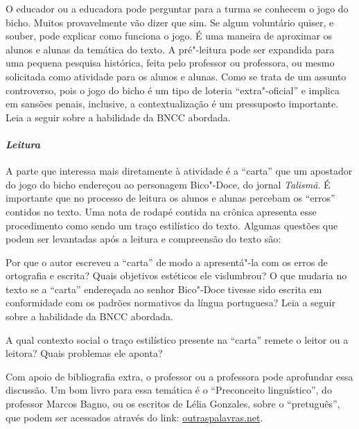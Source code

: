 \documentclass[11pt]{extarticle}
\begin{document}
O educador ou a educadora pode perguntar para a turma se conhecem o
jogo do bicho. Muitos provavelmente vão dizer que sim. Se algum
voluntário quiser, e souber, pode explicar como funciona o jogo. É uma
maneira de aproximar os alunos e alunas da temática do texto. A
pré"-leitura pode ser expandida para uma pequena pesquisa histórica,
feita pelo professor ou professora, ou mesmo solicitada como atividade
para os alunos e alunas. Como se trata de um assunto controverso, pois o
jogo do bicho é um tipo de loteria ``extra"-oficial'' e implica em
sansões penais, inclusive, a contextualização é um pressuposto
importante.
Leia a seguir sobre a habilidade da BNCC abordada.


\paragraph{\textit{Leitura}}

A parte que interessa mais diretamente à atividade é a ``carta'' que um
apostador do jogo do bicho endereçou ao personagem Bico"-Doce, do jornal
\emph{Talismã}. É importante que no processo de leitura os alunos e
alunas percebam os ``erros'' contidos no texto. Uma nota de rodapé
contida na crônica apresenta esse procedimento como sendo um traço
estilístico do texto. Algumas questões que podem ser levantadas após a
leitura e compreensão do texto são:

Por que o autor escreveu a ``carta'' de modo a apresentá"-la com os
erros de ortografia e escrita? Quais objetivos estéticos ele vislumbrou?
O que mudaria no texto se a ``carta'' endereçada ao senhor Bico"-Doce
tivesse sido escrita em conformidade com os padrões normativos da língua
portuguesa?
Leia a seguir sobre a habilidade da BNCC abordada.

A qual contexto social o traço estilístico presente na ``carta''
remete o leitor ou a leitora? Quais problemas ele aponta?

Com apoio de bibliografia extra, o professor ou a professora pode
aprofundar essa discussão. Um bom livro para essa temática é o
``Preconceito linguístico'', do professor Marcos Bagno, ou os escritos
de Lélia Gonzales, sobre o ``pretuguês'', que podem ser acessados
através do link:
\href{https://outraspalavras.net/eurocentrismoemxeque/para-compreender-a-amefrica-e-o-pretugues/}{outraspalavras.net}.
\end{document}
